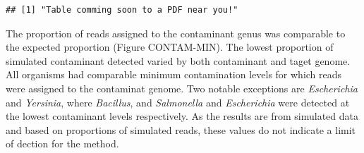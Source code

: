 \documentclass[fleqn,10pt,lineno]{wlpeerj}\usepackage[]{graphicx}\usepackage[]{color}
\makeatletter
\newenvironment{kframe}{%
 \def\at@end@of@kframe{}%
 \ifinner\ifhmode%
  \def\at@end@of@kframe{\end{minipage}}%
  \begin{minipage}{\columnwidth}%
 \fi\fi%
 \def\FrameCommand##1{\hskip\@totalleftmargin \hskip-\fboxsep
 \colorbox{shadecolor}{##1}\hskip-\fboxsep
     \hskip-\linewidth \hskip-\@totalleftmargin \hskip\columnwidth}%
 \MakeFramed {\advance\hsize-\width
   \@totalleftmargin\z@ \linewidth\hsize
   \@setminipage}}%
 {\par\unskip\endMakeFramed%
 \at@end@of@kframe}
\newenvironment{knitrout}{}{} %
\makeatother
\begin{document}
\begin{knitrout}
\color{fgcolor}\begin{kframe}
\begin{verbatim}
## [1] "Table comming soon to a PDF near you!"
\end{verbatim}
\end{kframe}
\end{knitrout}

The proportion of reads assigned to the contaminant genus was comparable to the expected proportion (Figure CONTAM-MIN). 
The lowest proportion of simulated contaminant detected varied by both contaminant and taget genome. 
All organisms had comparable minimum contamination levels for which reads were assigned to the contaminat genome. 
Two notable exceptions are \textit{Escherichia} and \textit{Yersinia}, where \textit{Bacillus}, and \textit{Salmonella} and \textit{Escherichia} were detected at the lowest contaminant levels respectively. 
As the results are from simulated data and based on proportions of simulated reads, these values do not indicate a limit of dection for the method.
\end{document}
